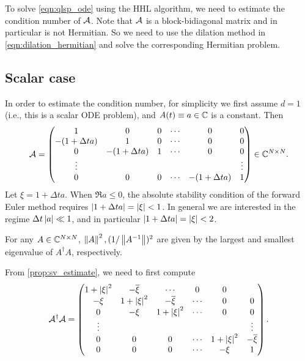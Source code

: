 To solve \cref{eqn:qlsp_ode} using the HHL algorithm, we need to estimate the condition number of $\mathcal{A}$. 
Note that $\mathcal{A}$ is a block-bidiagonal matrix and in particular is not Hermitian. So we need to use the dilation method in \cref{eqn:dilation_hermitian} and solve the corresponding Hermitian problem.

\subsection{Scalar case}
In order to estimate the condition number, for simplicity we first assume $d=1$ (i.e., this is a scalar ODE problem), and $A(t)\equiv a\in\mathbb{C}$ is a constant. Then
\begin{equation}
\mathcal{A}=\begin{pmatrix}
1 & 0 & 0 & \cdots & 0 & 0\\
-(1+\Delta t a) & 1 & 0 & \cdots & 0 & 0\\
0 & -(1+\Delta t a) & 1 & \cdots & 0 & 0\\
\vdots & & & & &\vdots\\
0& 0 & 0 & \cdots & -(1+\Delta t a) & 1
\end{pmatrix}\in\mathbb{C}^{N\times N}.
\end{equation} 
Let $\xi=1+\Delta t a$. When $\Re a\le 0$, the absolute stability condition of the forward Euler method requires 
$\left\lvert1+\Delta t a\right\rvert=\left\lvert\xi\right\rvert<1$. 
In general we are interested in the regime $\Delta t \left\lvert a\right\rvert\ll 1$, and in particular $\left\lvert1+\Delta t a\right\rvert=\left\lvert\xi\right\rvert<2$.

\begin{prop}
For any $A\in \mathbb{C}^{N\times N}$, $\left\lVert A\right\rVert^2,(1/\left\lVert A^{-1}\right\rVert)^2$ are given by the largest and smallest eigenvalue of $A^{\dag}A$, respectively.  
\label{prop:sv_estimate}
\end{prop}


From \cref{prop:sv_estimate}, we need to first compute
\begin{equation}
\mathcal{A}^{\dag}\mathcal{A}=\begin{pmatrix}
1+\left\lvert\xi\right\rvert^2 &  -\overline{\xi} & \cdots & 0 & 0\\
-\xi & 1+\left\lvert\xi\right\rvert^2 & -\overline{\xi} & \cdots & 0 & 0\\
0 & -\xi & 1+\left\lvert\xi\right\rvert^2 & \cdots & 0 & 0\\
\vdots & & & & &\vdots\\
0& 0 & 0 & \cdots & 1+\left\lvert\xi\right\rvert^2 & -\overline{\xi}\\
0& 0 & 0 & \cdots & -\xi & 1
\end{pmatrix}.
\end{equation}

